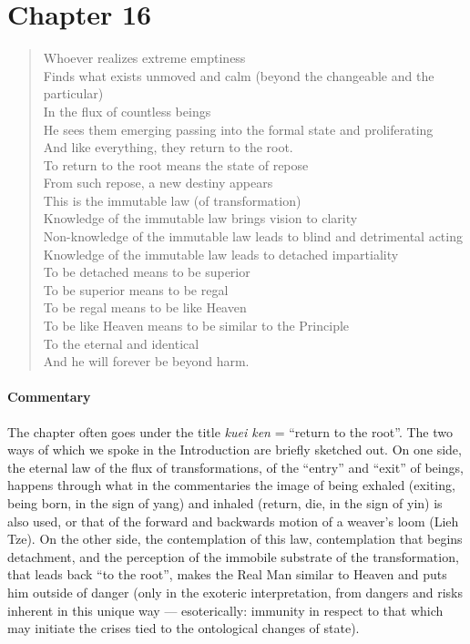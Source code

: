 \section{Chapter 16}

\begin{verse}
Whoever realizes extreme emptiness\\
Finds what exists unmoved and calm (beyond the changeable and the particular)\\
In the flux of countless beings\\
He sees them emerging passing into the formal state and proliferating\\
And like everything, they return to the root.\\
To return to the root means the state of repose\\
From such repose, a new destiny appears\\
This is the immutable law (of transformation)\\
Knowledge of the immutable law brings vision to clarity\\
Non-knowledge of the immutable law leads to blind and detrimental acting\\
Knowledge of the immutable law leads to detached impartiality\\
To be detached means to be superior\\
To be superior means to be regal\\
To be regal means to be like Heaven\\
To be like Heaven means to be similar to the Principle\\
To the eternal and identical\\
And he will forever be beyond harm.
\end{verse}

\paragraph{Commentary}


The chapter often goes under the title \emph{kuei ken} = ``return to the root''. The two ways of which we spoke in the Introduction are briefly sketched out. On one side, the eternal law of the flux of transformations, of the ``entry'' and ``exit'' of beings, happens through what in the commentaries the image of being exhaled (exiting, being born, in the sign of yang) and inhaled (return, die, in the sign of yin) is also used, or that of the forward and backwards motion of a weaver's loom (Lieh Tze). On the other side, the contemplation of this law, contemplation that begins detachment, and the perception of the immobile substrate of the transformation, that leads back ``to the root'', makes the Real Man similar to Heaven and puts him outside of danger (only in the exoteric interpretation, from dangers and risks inherent in this unique way --- esoterically: immunity in respect to that which may initiate the crises tied to the ontological changes of state).

